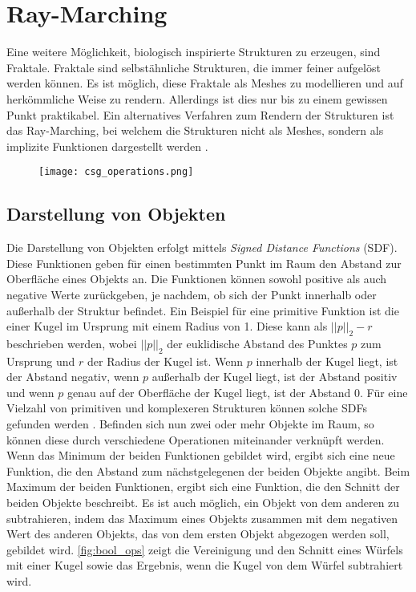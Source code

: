 \section{Ray-Marching}
Eine weitere Möglichkeit, biologisch inspirierte Strukturen zu erzeugen, sind Fraktale.
Fraktale sind selbstähnliche Strukturen, die immer feiner aufgelöst werden können.
Es ist möglich, diese Fraktale als Meshes zu modellieren und auf herkömmliche Weise zu rendern.
Allerdings ist dies nur bis zu einem gewissen Punkt praktikabel.
Ein alternatives Verfahren zum Rendern der Strukturen ist das Ray-Marching, bei welchem die Strukturen nicht als Meshes, sondern als implizite Funktionen dargestellt werden \cite{wikipedia_raymarching}.

\begin{figure}[!htbp]\centering
    \texttt{[image: csg\_operations.png]}
    \caption{\cite{fotonixx_csg}}
    \label{fig:bool_ops}
\end{figure}

\subsection{Darstellung von Objekten} \label{sec:ray_marching:objects}
Die Darstellung von Objekten erfolgt mittels \emph{Signed Distance Functions} (SDF).
Diese Funktionen geben für einen bestimmten Punkt im Raum den Abstand zur Oberfläche eines Objekts an.
Die Funktionen können sowohl positive als auch negative Werte zurückgeben, je nachdem, ob sich der Punkt innerhalb oder außerhalb der Struktur befindet.
Ein Beispiel für eine primitive Funktion ist die einer Kugel im Ursprung mit einem Radius von 1.
Diese kann als $||p||_2 - r$ beschrieben werden, wobei $||p||_2$ der euklidische Abstand des Punktes $p$ zum Ursprung und $r$ der Radius der Kugel ist.
Wenn $p$ innerhalb der Kugel liegt, ist der Abstand negativ, wenn $p$ außerhalb der Kugel liegt, ist der Abstand positiv und wenn $p$ genau auf der Oberfläche der Kugel liegt, ist der Abstand 0.
Für eine Vielzahl von primitiven und komplexeren Strukturen können solche SDFs gefunden werden \cite{iquilezles_distfunctions}.
Befinden sich nun zwei oder mehr Objekte im Raum, so können diese durch verschiedene Operationen miteinander verknüpft werden.
Wenn das Minimum der beiden Funktionen gebildet wird, ergibt sich eine neue Funktion, die den Abstand zum nächstgelegenen der beiden Objekte angibt.
Beim Maximum der beiden Funktionen, ergibt sich eine Funktion, die den Schnitt der beiden Objekte beschreibt.
Es ist auch möglich, ein Objekt von dem anderen zu subtrahieren, indem das Maximum eines Objekts zusammen mit dem negativen Wert des anderen Objekts, das von dem ersten Objekt abgezogen werden soll, gebildet wird.
\autoref{fig:bool_ops} zeigt die Vereinigung und den Schnitt eines Würfels mit einer Kugel sowie das Ergebnis, wenn die Kugel von dem Würfel subtrahiert wird.


